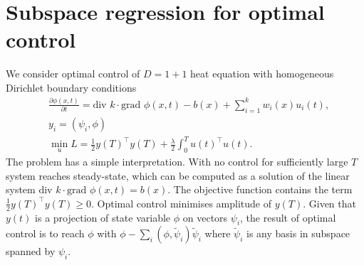 \documentclass{article}
\begin{document}
\section{Subspace regression for optimal control}
\label{appendix:icontrol_numerics}
We consider optimal control of $D=1+1$ heat equation with homogeneous Dirichlet boundary conditions
\begin{equation}
	\label{eq:heat_control}
	\begin{split}
		&\frac{\partial \phi(x, t)}{\partial t} = \text{div }k\cdot\text{grad }\phi(x, t)  - b(x) + \sum_{i=1}^{k}w_i(x) u_i(t),\\
		&y_i = \left(\psi_i, \phi\right)\\
		&\min_{u} L = \frac{1}{2}y(T)^\top y(T) + \frac{\lambda}{2}\int_{0}^{T}u(t)^\top u(t).
	\end{split}
\end{equation}
The problem has a simple interpretation. With no control for sufficiently large $T$ system reaches steady-state, which can be computed as a solution of the linear system $\text{div }k\cdot\text{grad }\phi(x, t) = b(x)$. The objective function contains the term $\frac{1}{2}y(T)^\top y(T) \geq 0$. Optimal control minimises  amplitude of $y(T)$. Given that $y(t)$ is a projection of state variable $\phi$ on vectors $\psi_i$, the result of optimal control is to reach $\phi$ with $\phi - \sum_{i}\left(\phi, \widetilde{\psi}_i\right)\widetilde{\psi}_i$ where $\widetilde{\psi}_i$ is any basis in subspace spanned by $\psi_i$.
\end{document}

